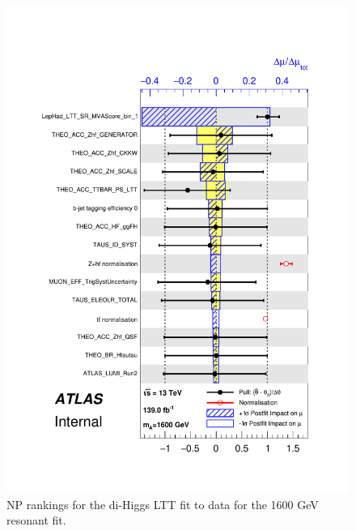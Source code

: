    \begin{figure}
   \centering
   \includegraphics[width=.8\textwidth]{figures/results/HH/LepHad/pulls_SigXsecOverSM_1600_LTT.pdf}
   \caption{NP rankings for the di-Higgs \lephad LTT fit to data for the 1600 GeV resonant fit.}
   \label{fig:LepHadPostfitNPRankings2HDM1600LTT}
   \end{figure}
   
